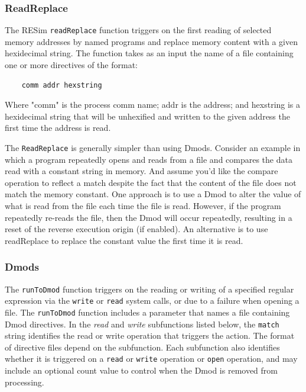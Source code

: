 \documentclass[titlepage]{article}
\begin{document}
\subsubsection{ReadReplace}
The RESim {\tt readReplace} function triggers on the first reading of selected memory addresses
by named programs and replace memory content with a given hexidecimal string.  The function takes as an
input the name of a file containing one or more directives of the format:
\begin{verbatim}
    comm addr hexstring
\end{verbatim}
Where "comm" is the process comm name; addr is the address; and hexstring
is a hexidecimal string that will be unhexified and written to the given
address the first time the address is read.

The {\tt ReadReplace} is generally simpler than using Dmods.  Consider an example in which a program
repeatedly opens and reads from a file and compares the data read with a constant string in memory.
And assume you'd like the compare operation to reflect a match despite the fact that the content of
the file does not match the memory constant.  One approach is to use a Dmod to alter the value of what
is read from the file each time the file is read.  However, if the program repeatedly re-reads the file,
then the Dmod will occur repeatedly, resulting in a reset of the reverse execution origin (if enabled).
An alternative is to use readReplace to replace the constant value the first time it is read.  

\subsubsection{Dmods}
The {\tt runToDmod} function triggers on the reading or writing of a specified
regular expression via the {\tt write} or {\tt read} system calls, or due to a failure
when opening a file.    
The {\tt runToDmod} function includes a parameter that names a file containing
Dmod directives.  In the \textit{read} and \textit{write} subfunctions listed
below, the {\tt match} string identifies the read or write operation that triggers the action. 
The format of directive files depend on the subfunction.  Each subfunction also identifies whether it is
triggered on a {\tt read} or {\tt write} operation or {\tt open} operation, and may include an optional count value to control when
the Dmod is removed from processing.
 
\end{document}

